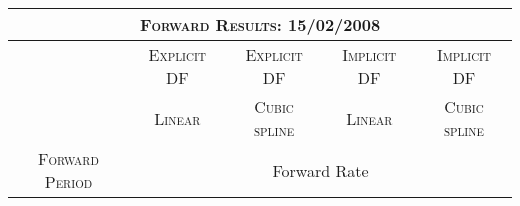 
\begin{landscape}

\begin{table}[ht]
\begin{center}
\begin{tabular}{c|c|c|c|c}

\multicolumn{5}{c}{\textsc{Forward Results: 15/02/2008}} \\
\toprule
& \textsc{Explicit DF} & \textsc{Explicit DF} & \textsc{Implicit DF} & \textsc{Implicit DF} \\
 
 & \textsc{Linear} & \textsc{Cubic spline} & \textsc{Linear} & \textsc{Cubic spline}  \\

\toprule
\textsc{Forward Period} & \multicolumn{4}{c}{Forward Rate} \\



\end{tabular}
\end{center}
\end{table}
\end{landscape}
